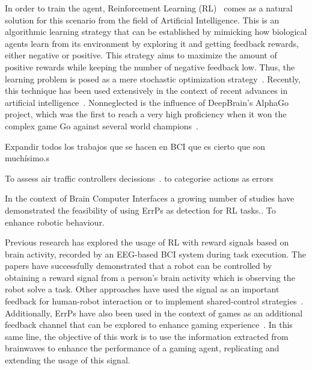 \documentclass[journal]{IEEEtran}
\begin{document}
In order to train the agent, Reinforcement Learning (RL)~\cite{Santos1999,Sutton2018} comes as a natural solution for this scenario from the field of Artificial Intelligence.  This is an algorithmic learning strategy that can be established by mimicking how biological agents learn from its environment by exploring it and getting feedback rewards, either negative or positive.  This strategy aims to maximize the amount of positive rewards while keeping the number of negative feedback low.  Thus, the learning problem is  posed as a mere stochastic optimization strategy~\cite{sutton2018reinforcement}.  Recently, this technique has been used extensively in the context of recent advances in artificial intelligence~\cite{REF}. Nonneglected is the influence of DeepBrain's AlphaGo project, which was the first to reach a very high proficiency when it won the complex game Go against several world champions~\cite{ALPHA-GO}.


Expandir todos los trabajos que se hacen en BCI que es cierto que son muchísimo.s

To assess air traffic controllers decissions~\cite{Goh2019}.  to categorise actions as errors

In the context of Brain Computer Interfaces a growing number of studies have demonstrated the feasibility of using ErrPs as detection for RL tasks.\cite{Wirth2020}.  To enhance robotic behaviour\cite{Luo2019}.

Previous research has explored the usage of RL with reward signals based on brain activity, recorded by an EEG-based BCI system during task execution. The papers \cite{ROBOT-CONTROL-PAPER,Kim2017,Omedes2013} have successfully demonstrated that a robot can be controlled by obtaining a reward signal from a person's brain activity which is observing the robot solve a task.  Other approaches have used the signal as an important feedback for human-robot interaction or to implement shared-control strategies~\cite{Schiatti2018}.  Additionally, ErrPs have also been used in the context of games as an additional feedback channel that can be explored to enhance gaming experience~\cite{Plass-OudeBos2010,kober2018bci}.  In this same line, the objective of this work is to use the information extracted from brainwaves to enhance the performance of a gaming agent, replicating and extending the usage of this signal.
\end{document}
